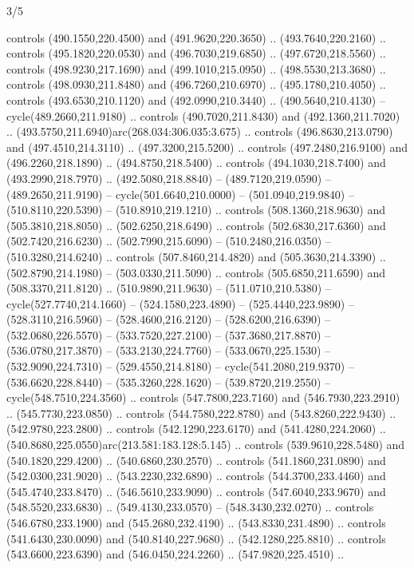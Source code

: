 \begin{flagdescription}{3/5}
\begin{scope}[xshift=0.5\flaglength,yshift=0.5\flagwidth,scale=\flagwidth/768]
\begin{scope}[y=0.80pt, x=0.80pt, yscale=-1.75, xscale=1.75,xshift=-74mm,yshift=-108mm]
\begin{scope}[shift={(-236.93803,83.83961)},fill=cc8a400]
  controls (490.1550,220.4500) and (491.9620,220.3650) .. (493.7640,220.2160) ..
  controls (495.1820,220.0530) and (496.7030,219.6850) .. (497.6720,218.5560) ..
  controls (498.9230,217.1690) and (499.1010,215.0950) .. (498.5530,213.3680) ..
  controls (498.0930,211.8480) and (496.7260,210.6970) .. (495.1780,210.4050) ..
  controls (493.6530,210.1120) and (492.0990,210.3440) .. (490.5640,210.4130) --
  cycle(489.2660,211.9180) .. controls (490.7020,211.8430) and
  (492.1360,211.7020) .. (493.5750,211.6940)arc(268.034:306.035:3.675) ..
  controls (496.8630,213.0790) and (497.4510,214.3110) .. (497.3200,215.5200) ..
  controls (497.2480,216.9100) and (496.2260,218.1890) .. (494.8750,218.5400) ..
  controls (494.1030,218.7400) and (493.2990,218.7970) .. (492.5080,218.8840) --
  (489.7120,219.0590) -- (489.2650,211.9190) -- cycle(501.6640,210.0000) --
  (501.0940,219.9840) -- (510.8110,220.5390) -- (510.8910,219.1210) .. controls
  (508.1360,218.9630) and (505.3810,218.8050) .. (502.6250,218.6490) .. controls
  (502.6830,217.6360) and (502.7420,216.6230) .. (502.7990,215.6090) --
  (510.2480,216.0350) -- (510.3280,214.6240) .. controls (507.8460,214.4820) and
  (505.3630,214.3390) .. (502.8790,214.1980) -- (503.0330,211.5090) .. controls
  (505.6850,211.6590) and (508.3370,211.8120) .. (510.9890,211.9630) --
  (511.0710,210.5380) -- cycle(527.7740,214.1660) -- (524.1580,223.4890) --
  (525.4440,223.9890) -- (528.3110,216.5960) -- (528.4600,216.2120) --
  (528.6200,216.6390) -- (532.0680,226.5570) -- (533.7520,227.2100) --
  (537.3680,217.8870) -- (536.0780,217.3870) -- (533.2130,224.7760) --
  (533.0670,225.1530) -- (532.9090,224.7310) -- (529.4550,214.8180) --
  cycle(541.2080,219.9370) -- (536.6620,228.8440) -- (535.3260,228.1620) --
  (539.8720,219.2550) -- cycle(548.7510,224.3560) .. controls
  (547.7800,223.7160) and (546.7930,223.2910) .. (545.7730,223.0850) .. controls
  (544.7580,222.8780) and (543.8260,222.9430) .. (542.9780,223.2800) .. controls
  (542.1290,223.6170) and (541.4280,224.2060) ..
  (540.8680,225.0550)arc(213.581:183.128:5.145) .. controls (539.9610,228.5480)
  and (540.1820,229.4200) .. (540.6860,230.2570) .. controls (541.1860,231.0890)
  and (542.0300,231.9020) .. (543.2230,232.6890) .. controls (544.3700,233.4460)
  and (545.4740,233.8470) .. (546.5610,233.9090) .. controls (547.6040,233.9670)
  and (548.5520,233.6830) .. (549.4130,233.0570) -- (548.3430,232.0270) ..
  controls (546.6780,233.1900) and (545.2680,232.4190) .. (543.8330,231.4890) ..
  controls (541.6430,230.0090) and (540.8140,227.9680) .. (542.1280,225.8810) ..
  controls (543.6600,223.6390) and (546.0450,224.2260) .. (547.9820,225.4510) ..

\end{scope}
\end{scope}
\end{scope}
\end{flagdescription}

